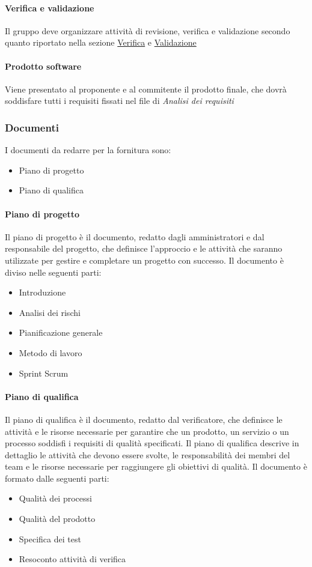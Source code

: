 \documentclass[12pt]{article}
\begin{document}
\paragraph{Verifica e validazione}
Il gruppo deve organizzare attività di revisione, verifica e validazione secondo quanto riportato nella sezione \hyperref[ver]{Verifica} e \hyperref[ver]{Validazione} 

\paragraph{Prodotto software}
Viene presentato al proponente e al commitente il prodotto finale, che dovrà soddisfare tutti i requisiti fissati nel file di \textit{Analisi dei requisiti}


\subsubsection{Documenti}
I documenti da redarre per la fornitura sono:
\begin{itemize}
    \item Piano di progetto
    \item Piano di qualifica
\end{itemize}
\paragraph{Piano di progetto}
Il piano di progetto è il documento, redatto dagli amministratori e dal responsabile del progetto, che definisce l'approccio e le attività che saranno utilizzate per gestire e completare un progetto con successo.
Il documento è diviso nelle seguenti parti:
\begin{itemize}
    \item Introduzione
    \item Analisi dei rischi
    \item Pianificazione generale
    \item Metodo di lavoro
    \item Sprint Scrum
\end{itemize}

\paragraph{Piano di qualifica}
Il piano di qualifica è il documento, redatto dal verificatore, che definisce le attività e le risorse necessarie per garantire che un prodotto, un servizio o un processo soddisfi i requisiti di qualità specificati. Il piano di qualifica descrive in dettaglio le attività che devono essere svolte, le responsabilità dei membri del team e le risorse necessarie per raggiungere gli obiettivi di qualità.
Il documento è formato dalle seguenti parti:
\begin{itemize}
    \item  Qualità dei processi
    \item  Qualità del prodotto
    \item  Specifica dei test
    \item Resoconto attività di verifica
\end{itemize}
\end{document}
